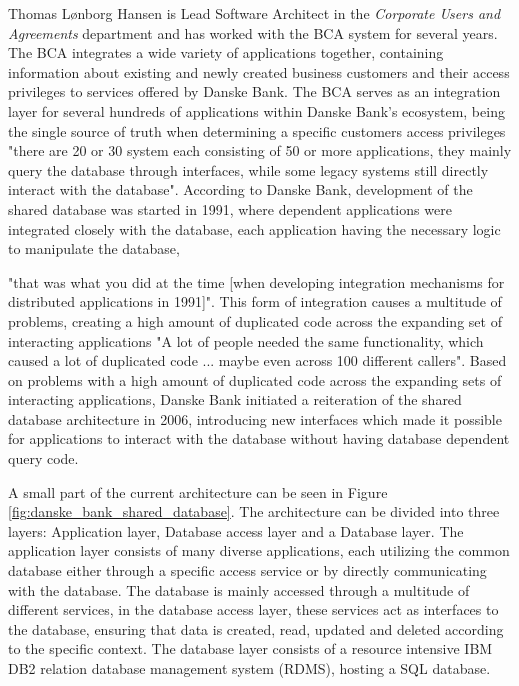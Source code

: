 Thomas Lønborg Hansen is Lead Software Architect in the \textit{Corporate Users and Agreements} department and has worked with the BCA system for several years. The BCA integrates a wide variety of applications together, containing information about existing and newly created business customers and their access privileges to services offered by Danske Bank. The BCA serves as an integration layer for several hundreds of applications within Danske Bank's ecosystem, being the single source of truth when determining a specific customers access privileges "there are 20 or 30 system each consisting of 50 or more applications, they mainly query the database through interfaces, while some legacy systems still directly interact with the database". According to Danske Bank, development of the shared database was started in 1991, where dependent applications were integrated closely with the database, each application having the necessary logic to manipulate the database, {"that was what you did at the time [when developing integration mechanisms for distributed applications in 1991]". This form of integration causes a multitude of problems, creating a high amount of duplicated code across the expanding set of interacting applications "A lot of people needed the same functionality, which caused a lot of duplicated code ... maybe even across 100 different callers". Based on problems with a high amount of duplicated code across the expanding sets of interacting applications, Danske Bank initiated a reiteration of the shared database architecture in 2006, introducing new interfaces which made it possible for applications to interact with the database without having database dependent query code.

A small part of the current architecture can be seen in Figure \ref{fig:danske_bank_shared_database}. The architecture can be divided into three layers: Application layer, Database access layer and a Database layer. The application layer consists of many diverse applications, each utilizing the common database either through a specific access service or by directly communicating with the database. The database is mainly accessed through a multitude of different services, in the database access layer, these services act as interfaces to the database, ensuring that data is created, read, updated and deleted according to the specific context. The database layer consists of a resource intensive IBM DB2 relation database management system (RDMS), hosting a SQL database. 


}
